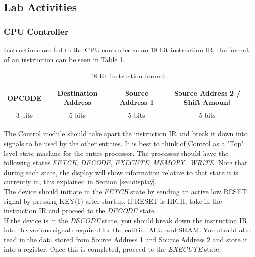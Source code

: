 \subsection{Lab Activities}


\subsubsection{CPU Controller}
\label{sec:control}
Instructions are fed to the CPU controller as an 18 bit instruction IR, the format of an instruction can be seen in Table \ref{tab:instruct}. 

\begin{table}[H]
	\caption{18 bit instruction format}
	\label{tab:instruct}
	\begin{center}
		\begin{tabular}{| c | c | c | c |}
			\hline
			{\bf OPCODE} & {\bf Destination Address} & {\bf Source Address 1} & {\bf Source Address 2 / Shift Amount} \\ \hline
			3 bits & 5 bits & 5 bits & 5 bits \\ 
			\hline
		\end{tabular}
	\end{center}
\end{table}

The Control module should take apart the instruction IR and break it down into signals to be used by the other entities. It is best to think of Control as a "Top" level state machine for the entire processor. The processor should have the following states \emph{FETCH}, \emph{DECODE}, \emph{EXECUTE}, \emph{MEMORY\_WRITE}. Note that during each state, the display will show information relative to that state it is currently in, this explained in Section \ref{sec:display}. \\ 

The device should initiate in the \emph{FETCH} state by sending an active low RESET signal by pressing KEY(1) after startup. If RESET is HIGH, take in the instruction IR and proceed to the \emph{DECODE} state. \\

If the device is in the \emph{DECODE} state, you should break down the instruction IR into the various signals required for the entities ALU and SRAM. You should also read in the data stored from Source Address 1 and Source Address 2 and store it into a register. Once this is completed,  proceed to the \emph{EXECUTE} state. \\

